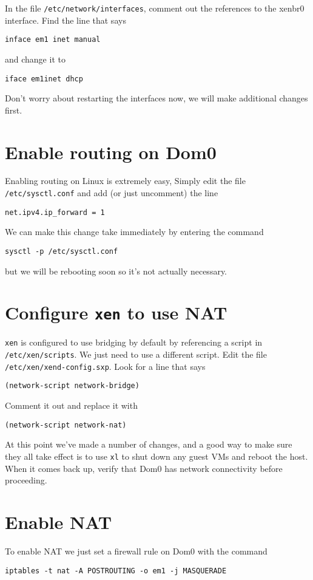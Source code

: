 \documentclass{article}
\begin{document}
In the file \texttt{/etc/network/interfaces}, comment out the references to the xenbr0 interface. Find the line that says

\texttt{inface em1 inet manual} 

and change it to

\texttt{iface em1inet dhcp}

Don't worry about restarting the interfaces now, we will make additional changes first.

\section{Enable routing on Dom0} 
Enabling routing on Linux is extremely easy, Simply edit the file \texttt{/etc/sysctl.conf} and add (or just 
uncomment) the line

\texttt{net.ipv4.ip\_forward = 1}

We can make this change take immediately by entering the command

\texttt{sysctl -p /etc/sysctl.conf}

but we will be rebooting soon so it's not actually necessary.

\section{Configure \texttt{xen} to use NAT}
\texttt{xen} is configured to use bridging by default by referencing a script in \texttt{/etc/xen/scripts}. We just need to 
use a different script. Edit the file \texttt{/etc/xen/xend-config.sxp}. Look for a line that says 

\texttt{(network-script network-bridge)}

Comment it out and replace it with 

\texttt{(network-script network-nat)}

At this point we've made a number of changes, and a good way to make sure they all take effect is to use \texttt{xl} 
to shut down any guest VMs and reboot the host. When it comes back up, verify that Dom0 has network connectivity 
before proceeding.

\section{Enable NAT}
To enable NAT we just set a firewall rule on Dom0 with the command

\texttt{iptables -t nat -A POSTROUTING -o em1 -j MASQUERADE}
\end{document}
